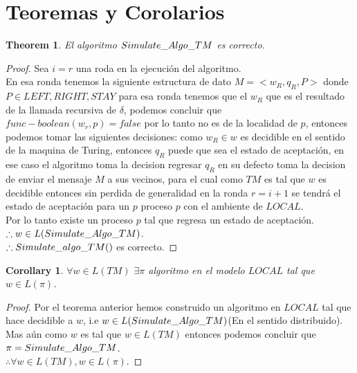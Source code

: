 \documentclass[10pt]{article}
\newtheorem*{corrolary}{Corollary}
\newtheorem{theorem}{Theorem}[section]
\begin{document}
    \section{Teoremas y Corolarios}\label{sec:teoremas-y-corolarios}
    \begin{theorem}
        El algoritmo $Simulate\char95 Algo\char95 TM$ es correcto.
    \end{theorem}
    \begin{proof}
        Sea $i=r$ una roda en la ejecución del algoritmo.\\
        En esa ronda tenemos la siguiente estructura de dato $M = <w_{R}, q_{R}, P>$ donde
        $P\in {LEFT,RIGHT,STAY}$ para esa ronda tenemos que el $w_{R}$ que es el resultado de la
        llamada recursiva de $\delta$, podemos concluir que $func-boolean(w_{r},p) = false $
        por lo tanto no es de la localidad de $p$, entonces podemos tomar las siguientes decisiones:
        como $w_{R}\in w$ es decidible en el sentido de la maquina de Turing, entonces $q_{R}$ puede que
        sea el estado de aceptación, en ese caso el algoritmo toma la decision regresar $q_{R}$ en su defecto
        toma la decision de enviar el mensaje $M$ a sus vecinos,
        para el cual como $TM$ es tal que $w$ es decidible entonces sin perdida de generalidad en la ronda $r=i+1$ se tendrá el estado de aceptación
        para un $p$ proceso $p$ con el ambiente de $LOCAL$.\\
        Por lo tanto existe un proceso $p$ tal que regresa un estado de aceptación.\\
        $\therefore w \in L(Simulate\char95 Algo\char95 TM)$.\\
        $\therefore Simulate\char95 algo\char95 TM()$ es correcto.
    \end{proof}

    \begin{corrolary}
        $\forall w \in L(TM)$ $\exists \pi$ algoritmo en el modelo $LOCAL$ tal que
        $w\in L(\pi)$.
    \end{corrolary}
    \begin{proof}
        Por el teorema anterior hemos construido un algoritmo en $LOCAL$ tal que
        hace decidible a $w$, i.e $w \in L(Simulate\char95 Algo\char95 TM)$(En el sentido distribuido).\\
        Mas aún como $w$ es tal que $w \in L(TM)$ entonces podemos concluir que $\pi = Simulate\char95 Algo\char95 TM$.\\
        $ \therefore \forall w \in L(TM), w\in L(\pi)$.
    \end{proof}
\end{document}

